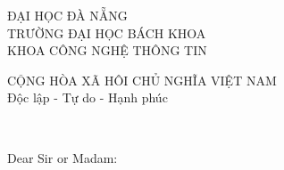 \documentclass[11pt]{article}
\begin{document}
\begin{minipage}[t]{.4\textwidth}
\centering
ĐẠI HỌC ĐÀ NẴNG\\
TRƯỜNG ĐẠI HỌC BÁCH KHOA\\
KHOA CÔNG NGHỆ THÔNG TIN
\end{minipage}
\hfill 
\begin{minipage}[t]{.4\textwidth}
\centering
CỘNG HÒA XÃ HÔI CHỦ NGHĨA VIỆT NAM\\
Độc lập - Tự do - Hạnh phúc
\end{minipage}\\[2em]

\raggedright
Dear Sir or Madam:\\[1.5em]
%
\end{document}
